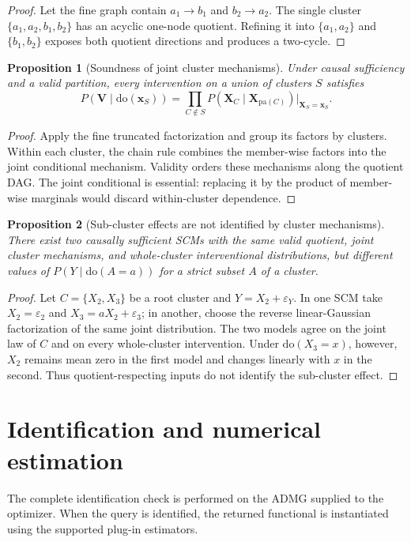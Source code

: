 \documentclass[twoside]{article}
\newtheorem{proposition}{Proposition}
\newcommand{\doo}{\mathrm{do}}
\begin{document}
\begin{proof}
Let the fine graph contain $a_1\to b_1$ and $b_2\to a_2$. The single cluster $\{a_1,a_2,b_1,b_2\}$ has an acyclic one-node quotient. Refining it into $\{a_1,a_2\}$ and $\{b_1,b_2\}$ exposes both quotient directions and produces a two-cycle.
\end{proof}

\begin{proposition}[Soundness of joint cluster mechanisms]
\label{prop:cluster-soundness}
Under causal sufficiency and a valid partition, every intervention on a
union of clusters $S$ satisfies
\[
 P(\mathbf V\mid\doo(\mathbf x_S))
 =\prod_{C\notin S}
 P(\mathbf X_C\mid\mathbf X_{\mathrm{pa}(C)})
 \big|_{\mathbf X_S=\mathbf x_S}.
\]
\end{proposition}

\begin{proof}
Apply the fine truncated factorization and group its factors by clusters. Within each cluster, the chain rule combines the member-wise factors into the joint conditional mechanism. Validity orders these mechanisms along the quotient DAG. The joint conditional is essential: replacing it by the product of member-wise marginals would discard within-cluster dependence.
\end{proof}

\begin{proposition}[Sub-cluster effects are not identified by cluster mechanisms]
\label{prop:qexposure}
There exist two causally sufficient SCMs with the same valid quotient, joint cluster mechanisms, and whole-cluster interventional distributions, but different values of $P(Y\mid\doo(A=a))$ for a strict subset $A$ of a cluster.
\end{proposition}

\begin{proof}
Let $C=\{X_2,X_3\}$ be a root cluster and $Y=X_2+\varepsilon_Y$. In one SCM take $X_2=\varepsilon_2$ and $X_3=aX_2+\varepsilon_3$; in another, choose the reverse linear-Gaussian factorization of the same joint distribution. The two models agree on the joint law of $C$ and on every whole-cluster intervention. Under $\doo(X_3=x)$, however, $X_2$ remains mean zero in the first model and changes linearly with $x$ in the second. Thus quotient-respecting inputs do not identify the sub-cluster effect.
\end{proof}

\clearpage
\section{Identification and numerical estimation}
\label{app:estimators}
The complete identification check is performed on the ADMG supplied to the optimizer. When the query is identified, the returned functional is instantiated using the supported plug-in estimators.
\end{document}
